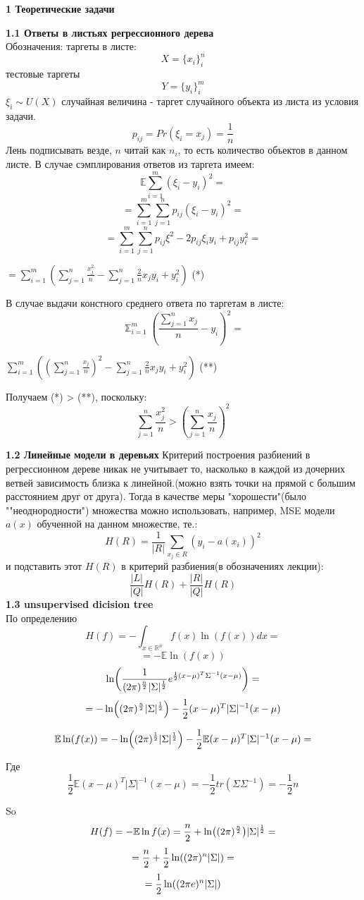 \documentclass[11pt,a4paper]{article}
\newcommand{\lnb}[1]{%
  \ln\mleft(#1\mright)%
}
\begin{document}
\begin{center}
\Huge {
\noindent
\textbf{1 Теоретические задачи}
}
\end{center}

\Large {
\textbf {1.1 Ответы в листьях регрессионного дерева}
}
\\
Обозначения:
таргеты в листе:
$$ X = \{x_i\}_i^n $$
тестовые таргеты
$$ Y = \{y_i\}_i^m $$
$\xi_i \sim U(X)$ случайная величина - таргет случайного объекта из листа из условия задачи.
$$ p_{ij} = Pr(\xi_i = x_j) = \frac{1}{n}$$
Лень подписывать везде, $n$ читай как $n_i$, то есть количество объектов в данном листе.
В случае сэмплирования ответов из таргета имеем:
\\
$$\mathbb{E} \sum_{i=1}^m (\xi_i - y_i)^2 =$$
$$ = \sum_{i=1}^m \sum_{j=1}^n p_{ij} (\xi_i - y_i)^2 =$$
$$ = \sum_{i=1}^m \sum_{j=1}^n p_{ij} \xi^2 - 2p_{ij} \xi_i y_i + p_{ij}y_i^2 = $$
\begin{center}
$ = \sum_{i=1}^m( \sum_{j=1}^n {\frac{x_j^2}{n}} - \sum_{j=1}^n \frac{2}{n} x_j y_i + y_i^2)$ (*)
\end{center}
В случае выдачи констного среднего ответа по таргетам в листе:
\\
$$ \mathbb \sum_{i=1}^m (\frac{\sum_{j=1}^n x_j}{n} - y_i)^2 = $$
\begin{center}
$ \sum_{i=1}^m ( (\sum_{j=1}^n \frac{x_j}{n})^2 - \sum_{j=1}^n \frac{2}{n} x_j y_i + y_i^2)$ (**)
\end{center}
Получаем (*) > (**), поскольку:
$$ \sum_{j=1}^n \frac{x_j^2}{n} > (\sum_{j=1}^n \frac{x_j}{n})^2 $$

\Large {
\textbf {1.2 Линейные модели в деревьях}
}
Критерий построения разбиений в регрессионном дереве никак не учитывает то, насколько в каждой из дочерних ветвей зависимость близка к линейной.(можно взять точки на прямой с большим расстоянием друг от друга).
Тогда в качестве меры "хорошести"(было ""неоднородности") множества можно использовать, например, MSE модели $a(x)$ обученной на данном множестве, те.:
$$ H(R) = \frac{1}{|R|} \sum_{x_j \in R}(y_i - a(x_i))^2 $$
и подставить этот $H(R)$ в критерий разбиения(в обозначениях лекции):
$$ \frac{|L|}{|Q|} H(R) + \frac{|R|}{|Q|} H(R) $$
\Large {
\textbf {1.3 unsupervised dicision tree}
}
\\
По определению $$H(f) = -\int_{x \in \mathbb{R}^n}^{} f(x) \ln(f(x))dx = $$
$$ = -\mathbb{E}\ln(f(x)) $$
$$ \lnb{\frac{1}{(2\pi)^{\frac{n}{2}} |\Sigma|^{\frac{1}{2}} } e^{ \frac{1}{2} (x - \mu)^T \Sigma^{-1} (x-\mu) }} = $$
$$ = -\lnb{(2\pi)^{\frac{n}{2}} |\Sigma|^{\frac{1}{2}}} - \frac{1}{2} (x - \mu)^T |\Sigma|^{-1} (x - \mu)$$

$$ \mathbb{E} \lnb{f(x)} = -\lnb{(2\pi)^{\frac{1}{2}} |\Sigma|^{\frac{1}{2}}} - \frac{1}{2} \mathbb{E} (x-\mu)^T |\Sigma|^{-1} (x - \mu) = $$

Где $$ \frac{1}{2} \mathbb{E} (x-\mu)^T |\Sigma|^{-1} (x - \mu) =  -\frac{1}{2} tr(\Sigma \Sigma^{-1}) = -\frac{1}{2}n$$

So
$$ H(f) =  -\mathbb{E}\ln f(x)  = \frac{n}{2} + \lnb{(2\pi)^{\frac{n}{2}}} |\Sigma|^{\frac{1}{2}} =$$
$$ = \frac{n}{2} + \frac{1}{2} \lnb {(2\pi)^n |\Sigma|} = $$
$$ = \frac{1}{2} \lnb{(2\pi e)^n |\Sigma|} $$
\end{document}
